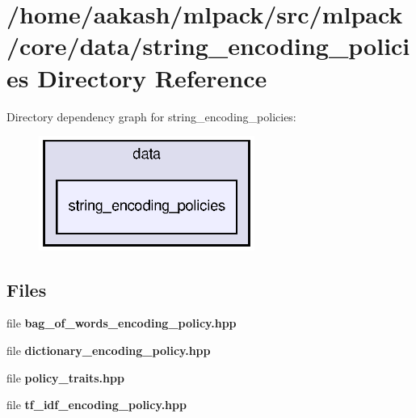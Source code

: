 \section{/home/aakash/mlpack/src/mlpack/core/data/string\+\_\+encoding\+\_\+policies Directory Reference}
\label{dir_b3c5350e667f151883a666a1430e6001}
Directory dependency graph for string\+\_\+encoding\+\_\+policies\+:
\nopagebreak
\begin{figure}[H]
\begin{center}
\leavevmode
\includegraphics[width=200pt]{dir_b3c5350e667f151883a666a1430e6001_dep}
\end{center}
\end{figure}
\subsection*{Files}
\begin{DoxyCompactItemize}
\item 
file \textbf{ bag\+\_\+of\+\_\+words\+\_\+encoding\+\_\+policy.\+hpp}
\item 
file \textbf{ dictionary\+\_\+encoding\+\_\+policy.\+hpp}
\item 
file \textbf{ policy\+\_\+traits.\+hpp}
\item 
file \textbf{ tf\+\_\+idf\+\_\+encoding\+\_\+policy.\+hpp}
\end{DoxyCompactItemize}
